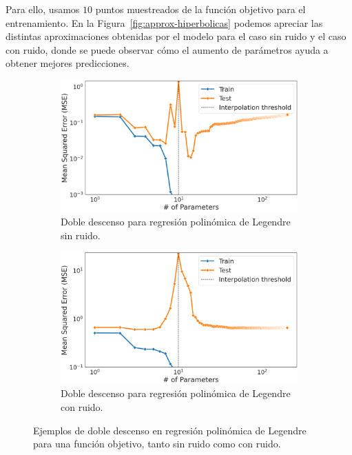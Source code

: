 Para ello, usamos $10$ puntos muestreados de la función objetivo para el entrenamiento. En la Figura~\ref{fig:approx-hiperbolicas} podemos apreciar las distintas aproximaciones obtenidas por el modelo para el caso sin ruido y el caso con ruido, donde se puede observar cómo el aumento de parámetros ayuda a obtener mejores predicciones.

\begin{figure}[h]
    \centering
    \begin{subfigure}[b]{0.48\textwidth}
        \centering
        \includegraphics[width=\textwidth]{img/experiments/hiperbolica_noiselessDDD.png}
        \caption{Doble descenso para regresión polinómica de Legendre sin ruido.}\label{fig:hiperbolica_noiselessDDD}
    \end{subfigure}
    \hfill
    \begin{subfigure}[b]{0.48\textwidth}
        \centering
        \includegraphics[width=\textwidth]{img/experiments/hiperbolica_noiseDDD.png}
        \caption{Doble descenso para regresión polinómica de Legendre con ruido.}\label{fig:hiperbolica_noiseDDD}
    \end{subfigure}
    \caption[Ejemplos de doble descenso en regresión polinómica de Legendre para una función objetivo, tanto con ruido como sin ruido.]{Ejemplos de doble descenso en regresión polinómica de Legendre para una función objetivo, tanto sin ruido como con ruido.}\label{fig:legendrehyperbolicDD}
\end{figure}

